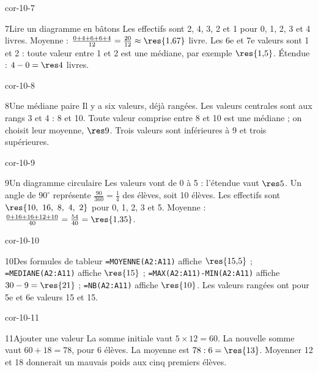 \begin{blocLivre}{cor-10-7}\begin{corrige}{7}{Lire un diagramme en bâtons}
Les effectifs sont 2, 4, 3, 2 et 1 pour 0, 1, 2, 3 et 4 livres. Moyenne : $\frac{0+4+6+6+4}{12}=\frac{20}{12}\approx\res{1{,}67}$ livre. Les 6e et 7e valeurs sont 1 et 2 : toute valeur entre 1 et 2 est une médiane, par exemple $\res{1{,}5}$. Étendue : $4-0=\res4$ livres.
\label{fig-cor-10-7}
\end{corrige}\end{blocLivre}
\begin{blocLivre}{cor-10-8}\begin{corrige}{8}{Une médiane paire}
Il y a six valeurs, déjà rangées. Les valeurs centrales sont aux rangs 3 et 4 : 8 et 10. Toute valeur comprise entre 8 et 10 est une médiane ; on choisit leur moyenne, $\res9$. Trois valeurs sont inférieures à 9 et trois supérieures.
\end{corrige}\end{blocLivre}
\begin{blocLivre}{cor-10-9}\begin{corrige}{9}{Un diagramme circulaire}
Les valeurs vont de 0 à 5 : l’étendue vaut $\res5$. Un angle de $90^\circ$ représente $\frac{90}{360}=\frac14$ des élèves, soit 10 élèves. Les effectifs sont $\res{10,\ 16,\ 8,\ 4,\ 2}$ pour 0, 1, 2, 3 et 5. Moyenne : $\frac{0+16+16+12+10}{40}=\frac{54}{40}=\res{1{,}35}$.
\label{fig-cor-10-9}
\end{corrige}\end{blocLivre}
\begin{blocLivre}{cor-10-10}\begin{corrige}{10}{Des formules de tableur}
\texttt{=MOYENNE(A2:A11)} affiche $\res{15{,}5}$ ; \texttt{=MEDIANE(A2:A11)} affiche $\res{15}$ ; \texttt{=MAX(A2:A11)-MIN(A2:A11)} affiche $30-9=\res{21}$ ; \texttt{=NB(A2:A11)} affiche $\res{10}$. Les valeurs rangées ont pour 5e et 6e valeurs 15 et 15.
\end{corrige}\end{blocLivre}
\begin{blocLivre}{cor-10-11}\begin{corrige}{11}{Ajouter une valeur}
La somme initiale vaut $5\times12=60$. La nouvelle somme vaut $60+18=78$, pour 6 élèves. La moyenne est $78:6=\res{13}$. Moyenner 12 et 18 donnerait un mauvais poids aux cinq premiers élèves.
\end{corrige}\end{blocLivre}
